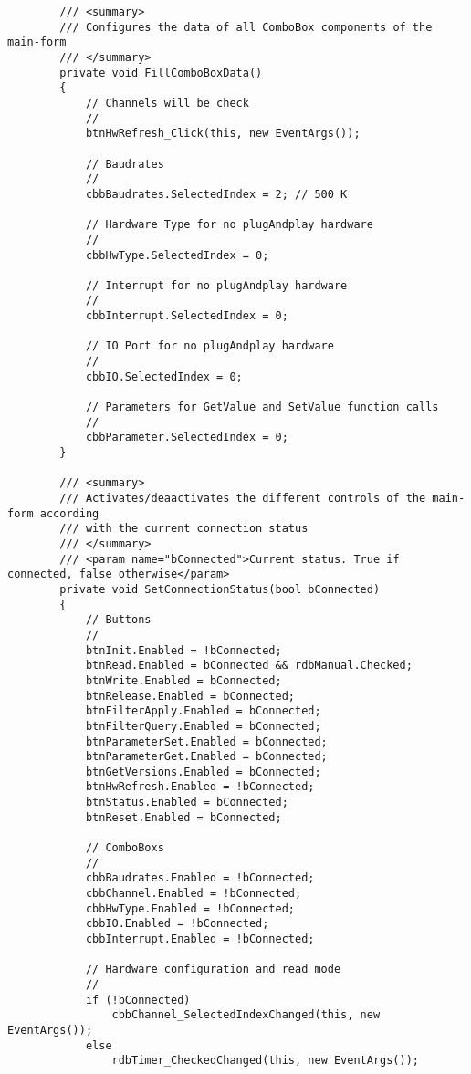 \begin{lstlisting}
        /// <summary>
        /// Configures the data of all ComboBox components of the main-form
        /// </summary>
        private void FillComboBoxData()
        {
            // Channels will be check
            //
            btnHwRefresh_Click(this, new EventArgs());

            // Baudrates
            //
            cbbBaudrates.SelectedIndex = 2; // 500 K

            // Hardware Type for no plugAndplay hardware
            //
            cbbHwType.SelectedIndex = 0;

            // Interrupt for no plugAndplay hardware
            //
            cbbInterrupt.SelectedIndex = 0;

            // IO Port for no plugAndplay hardware
            //
            cbbIO.SelectedIndex = 0;

            // Parameters for GetValue and SetValue function calls
            //
            cbbParameter.SelectedIndex = 0;
        }

        /// <summary>
        /// Activates/deaactivates the different controls of the main-form according
        /// with the current connection status
        /// </summary>
        /// <param name="bConnected">Current status. True if connected, false otherwise</param>
        private void SetConnectionStatus(bool bConnected)
        {
            // Buttons
            //
            btnInit.Enabled = !bConnected;
            btnRead.Enabled = bConnected && rdbManual.Checked;
            btnWrite.Enabled = bConnected;
            btnRelease.Enabled = bConnected;
            btnFilterApply.Enabled = bConnected;
            btnFilterQuery.Enabled = bConnected;
            btnParameterSet.Enabled = bConnected;
            btnParameterGet.Enabled = bConnected;
            btnGetVersions.Enabled = bConnected;
            btnHwRefresh.Enabled = !bConnected;
            btnStatus.Enabled = bConnected;
            btnReset.Enabled = bConnected;

            // ComboBoxs
            //
            cbbBaudrates.Enabled = !bConnected;
            cbbChannel.Enabled = !bConnected;
            cbbHwType.Enabled = !bConnected;
            cbbIO.Enabled = !bConnected;
            cbbInterrupt.Enabled = !bConnected;

            // Hardware configuration and read mode
            //
            if (!bConnected)
                cbbChannel_SelectedIndexChanged(this, new EventArgs());
            else
                rdbTimer_CheckedChanged(this, new EventArgs());


\end{lstlisting}
